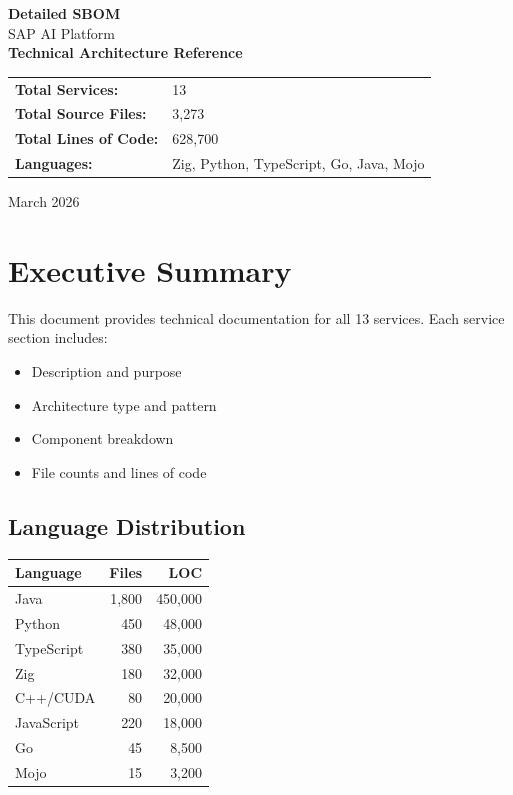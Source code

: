 \documentclass[11pt,a4paper]{article}
\begin{document}
\begin{titlepage}
\centering
\vspace*{2cm}
{\Huge\bfseries\textcolor{sapblue}{Detailed SBOM}\\[0.5cm]}
{\LARGE SAP AI Platform}\\[1cm]
{\Large\textbf{Technical Architecture Reference}}\\[3cm]

\begin{tabular}{ll}
\textbf{Total Services:} & 13 \\
\textbf{Total Source Files:} & 3,273 \\
\textbf{Total Lines of Code:} & 628,700 \\
\textbf{Languages:} & Zig, Python, TypeScript, Go, Java, Mojo \\
\end{tabular}

\vfill
{\large March 2026}
\end{titlepage}

\tableofcontents
\newpage

\section{Executive Summary}

This document provides technical documentation for all 13 services. Each service section includes:
\begin{itemize}[noitemsep]
    \item Description and purpose
    \item Architecture type and pattern  
    \item Component breakdown
    \item File counts and lines of code
\end{itemize}

\subsection{Language Distribution}

\begin{tabular}{lrr}
\toprule
\textbf{Language} & \textbf{Files} & \textbf{LOC} \\
\midrule
Java & 1,800 & 450,000 \\
Python & 450 & 48,000 \\
TypeScript & 380 & 35,000 \\
Zig & 180 & 32,000 \\
C++/CUDA & 80 & 20,000 \\
JavaScript & 220 & 18,000 \\
Go & 45 & 8,500 \\
Mojo & 15 & 3,200 \\
\bottomrule
\end{tabular}
\end{document}
